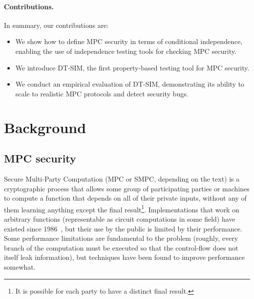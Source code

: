 \documentclass[acmlarge, manuscript, screen, review, anonymous, table]{acmart}
\newcommand{\toolname}{\textsc{DT-SIM}\xspace}
\begin{document}
\paragraph{Contributions.}
In summary, our contributions are:
%
\begin{itemize}
\item We show how to define MPC security in terms of conditional independence, enabling the use of independence testing tools for checking MPC security.
\item We introduce \toolname, the first property-based testing tool for MPC security.
\item We conduct an empirical evaluation of \toolname, demonstrating its ability to scale to realistic MPC protocols and detect security bugs.
\end{itemize}



\section{Background}

\subsection{MPC security}

Secure Multi-Party Computation (MPC or SMPC, depending on the text)
is a cryptographic process that allows some group of participating parties or machines
to compute a function that depends on all of their private inputs,
without any of them learning anything except the final result\footnote{
    It is possible for each party to have a distinct final result.
}.
Implementations that work on arbitrary functions (representable as circuit computations in some field)
have existed since 1986~\cite{yao1986generate}, %
but their use by the public is limited by their performance.
Some performance limitations are fundamental to the problem
(roughly, every branch of the computation must be executed so that the control-flow does not itself leak information),
but techniques have been found to improve performance somewhat.
\end{document}

